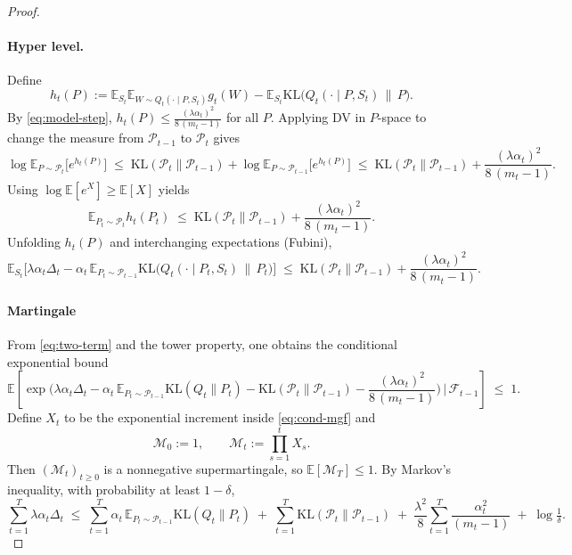 \documentclass{article} %
\begin{document}
\begin{proof}
\paragraph{Hyper level.} 
Define
\[
h_t(P):=\mathbb E_{S_t}\mathbb E_{W\sim Q_t(\cdot\mid P,S_t)} g_t(W)
-\mathbb E_{S_t}\mathrm{KL}\!\big(Q_t(\cdot\mid P,S_t)\,\|\,P\big).
\]
By \eqref{eq:model-step}, $h_t(P)\le \frac{(\lambda\alpha_t)^2}{8\,(m_t-1)}$ for all $P$.
Applying DV in $P$-space to change the measure from $\mathcal P_{t-1}$ to $\mathcal P_t$ gives
\begin{equation}
\label{eq:dv-p}
\log\mathbb E_{P\sim\mathcal P_t}\!\big[e^{h_t(P)}\big]
\;\le\; \mathrm{KL}(\mathcal P_t\|\mathcal P_{t-1})
+\log\mathbb E_{P\sim\mathcal P_{t-1}}\!\big[e^{h_t(P)}\big]
\;\le\; \mathrm{KL}(\mathcal P_t\|\mathcal P_{t-1})
+\frac{(\lambda\alpha_t)^2}{8\,(m_t-1)}.
\end{equation}
Using $\log\mathbb E[e^X]\ge \mathbb E[X]$ yields
\begin{equation}
\label{eq:p-expect}
\mathbb E_{P_t\sim\mathcal P_t} h_t(P_t)
\;\le\; \mathrm{KL}(\mathcal P_t\|\mathcal P_{t-1})
+\frac{(\lambda\alpha_t)^2}{8\,(m_t-1)}.
\end{equation}
Unfolding $h_t(P)$ and interchanging expectations (Fubini),
\begin{equation}
\label{eq:two-term}
\mathbb E_{S_t}\Big[
\lambda\alpha_t\Delta_t
-\alpha_t\,\mathbb E_{P_t\sim\mathcal P_{t-1}}\mathrm{KL}\!\big(Q_t(\cdot\mid P_t,S_t)\,\|\,P_t\big)
\Big]
\;\le\;
\mathrm{KL}(\mathcal P_t\|\mathcal P_{t-1})
+\frac{(\lambda\alpha_t)^2}{8\,(m_t-1)}.
\end{equation}

\paragraph{Martingale}
From \eqref{eq:two-term} and the tower property, one obtains the conditional exponential bound
\begin{equation}
\label{eq:cond-mgf}
\mathbb E\!\left[
\exp\!\Big(
\lambda\alpha_t\Delta_t
-\alpha_t\,\mathbb E_{P_t\sim\mathcal P_{t-1}}\mathrm{KL}(Q_t\|P_t)
-\mathrm{KL}(\mathcal P_t\|\mathcal P_{t-1})
-\frac{(\lambda\alpha_t)^2}{8\,(m_t-1)}
\Big)\,\Big|\,\mathcal F_{t-1}\right]\;\le\;1.
\end{equation}
Define $X_t$ to be the exponential increment inside \eqref{eq:cond-mgf} and
\[
\mathcal{M}_0:=1,\qquad
\mathcal{M}_t:=\prod_{s=1}^t X_s.
\]
Then $(\mathcal{M}_t)_{t\ge0}$ is a nonnegative supermartingale, so
$\mathbb E[\mathcal{M}_T]\le 1$.
By Markov's inequality, with probability at least $1-\delta$,
\begin{equation}
\label{eq:hpp}
\sum_{t=1}^T \lambda\alpha_t\Delta_t
\;\le\;
\sum_{t=1}^T \alpha_t\,\mathbb E_{P_t\sim\mathcal P_{t-1}}\mathrm{KL}(Q_t\|P_t)
\;+\; \sum_{t=1}^T \mathrm{KL}(\mathcal P_t\|\mathcal P_{t-1})
\;+\; \frac{\lambda^2}{8}\sum_{t=1}^T \frac{\alpha_t^2}{(m_t-1)}
\;+\; \log\tfrac1\delta.
\end{equation}


\end{proof}
\end{document}
